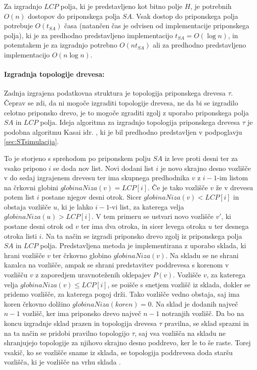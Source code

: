 Za izgradnjo $LCP$ polja, ki je predstavljeno kot bitno polje $H$, je potrebnih $O(n)$ dostopov do priponskega polja $SA$. Vsak dostop do priponskega polja potrebuje $O(t_{SA})$ časa (natančen čas je odvisen od implementacije priponskega polja), ki je za predhodno predstavljeno implementacijo $t_{SA}= O(\log{n})$, in potemtakem je za izgradnjo potrebno $O(nt_{SA})$ ali za predhodno predstavljeno implementacijo $O(n\log{n})$.

\paragraph{Izgradnja topologije drevesa:}
Zadnja izgrajena podatkovna struktura je topologija priponskega drevesa $\tau$. Čeprav se zdi, da ni mogoče izgraditi topologije drevesa, ne da bi se izgradilo celotno priponsko drevo, je to mogoče zgraditi zgolj z uporabo priponskega polja $SA$ in $LCP$ polja. Ideja algoritma za izgradnjo topologija priponskega drevesa $\tau$ je podobna algoritmu Kasai idr. \cite{Kasai2001}, ki je bil predhodno predstavljen v podpoglavju \ref{sec:STsimulacija}.

To je storjeno s sprehodom po priponskem polju $SA$ iz leve proti desni ter za vsako pripono $i$ se doda nov list. Novi dodani list $i$ je novo skrajno desno vozlišče v do sedaj izgrajenem drevesu ter ima skupnega predhodnika $v$ z $i-1$-im listom na črkovni globini $globinaNiza(v)=LCP[i]$. Če je tako vozlišče $v$ že v drevesu potem list $i$ postane njegov desni otrok. Sicer $globinaNiza(v)<LCP[i]$ in obstaja vozlišče $u$, ki je lahko $i-1$-vi list, za katerega velja $globinaNiza(u)>LCP[i]$. V tem primeru se ustvari novo vozlišče $v'$, ki postane desni otrok od $v$ ter ima dva otroka, in sicer levega otroka $u$ ter desnega otroka listi $i$. Na ta način se izgradi priponsko drevo zgolj iz priponskega polja $SA$ in $LCP$ polja. Predstavljena metoda je implementirana z uporabo sklada, ki hrani vozlišče $v$ ter črkovno globino $globinaNiza(v)$. Na skladu se ne shrani kazalca na vozlišče, ampak se shrani predstavitev poddrevesa s korenom v vozlišču $v$ z zaporedjem uravnoteženih oklepajev $P(v)$. Vozlišče $v$, za katerega velja $globinaNiza(v)\le LCP[i]$, se poišče s snetjem vozlišč iz sklada, dokler se pridemo vozlišče, za katerega pogoj drži. Tako vozlišče vedno obstaja, saj ima koren črkovno dolžino $globinaNiza(koren)=0$. Na sklad je dodanih največ $n-1$ vozlišč, ker ima priponsko drevo največ $n-1$ notranjih vozlišč. Da bo na koncu izgradnje sklad prazen in topologija drevesa $\tau$ pravilna, se sklad sprazni in na ta način se pridobi pravilno topologijo $\tau$, saj vsa vozlišča na skladu ne shranjujejo topologije za njihovo skrajno desno poddrevo, ker le to še raste. Torej vsakič, ko se vozlišče sname iz sklada, se topologija poddrevesa doda staršu vozlišča, ki je vozlišče na vrhu sklada \cite{Navarro2016}.

